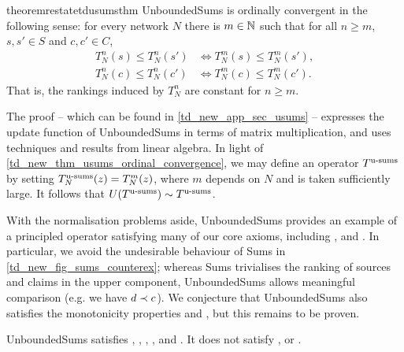 \begin{restatable}{theorem}{restatetdusumsthm}
    \label{td_new_thm_usums_ordinal_convergence}
    UnboundedSums is ordinally convergent in the following sense: for every
    network $N$ there is $m \in \mathbb{N}$ such that for all $n \ge m$, $s, s' \in
    S$ and $c, c' \in C$,
    \begin{align*}
        T^n_N(s) \le T^n_N(s') &\iff T^m_N(s) \le T^m_N(s'), \\
        T^n_N(c) \le T^n_N(c') &\iff T^m_N(c) \le T^m_N(c').
    \end{align*}
    That is, the rankings induced by $T^n_N$ are constant for $n \ge m$.
\end{restatable}

The proof -- which can be found in \cref{td_new_app_sec_usums} -- expresses the
update function of UnboundedSums in terms of matrix multiplication, and uses
techniques and results from linear algebra.
%
In light of \cref{td_new_thm_usums_ordinal_convergence}, we may define an
operator $T^{\operatorname{u-sums}}$ by setting $T^{\operatorname{u-sums}}_N(z) = T_N^m(z)$, where $m$ depends on $N$
and is taken sufficiently large. It follows that $U(T^{\operatorname{u-sums}}) \sim T^{\operatorname{u-sums}}$.

With the normalisation problems aside, UnboundedSums provides an example of a
principled operator satisfying many of our core axioms, including
\sourcecoherence{}, \claimcoherence{} and \disjointindependence{}. In
particular, we avoid the undesirable behaviour of Sums in
\cref{td_new_fig_sums_counterex}; whereas Sums trivialises the ranking of
sources and claims in the upper component, UnboundedSums allows meaningful
comparison (e.g. we have $d \prec c$). We conjecture that UnboundedSums also
satisfies the monotonicity properties \freshposresp{} and \sourceposresp{}, but
this remains to be proven.\footnotemark{}


\begin{theorem}
    UnboundedSums satisfies \sourcecoherence{}, \claimcoherence{}, \symmetry{},
    \marginaltrustworthiness{}, \trustbasedmon{} and \disjointindependence{}.
    It does not satisfy \classicalindependence{}, \conflictcoherence{} or
    \anticoherence{}.
\end{theorem}

